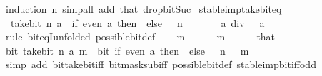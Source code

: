 \begin{isabellebody}
\ {\isacharparenleft}{\kern0pt}induction\ n{\isacharparenright}{\kern0pt}\ {\isacharparenleft}{\kern0pt}simp{\isacharunderscore}{\kern0pt}all\ add{\isacharcolon}{\kern0pt}\ that\ drop{\isacharunderscore}{\kern0pt}bit{\isacharunderscore}{\kern0pt}Suc{\isacharparenright}{\kern0pt}%
\endisatagproof
{\isafoldproof}%
%
\isadelimproof
\isanewline
%
\endisadelimproof
\isanewline
{}\isamarkupfalse%
\ stable{\isacharunderscore}{\kern0pt}imp{\isacharunderscore}{\kern0pt}take{\isacharunderscore}{\kern0pt}bit{\isacharunderscore}{\kern0pt}eq{\isacharcolon}{\kern0pt}\isanewline
\ \ {\isacartoucheopen}take{\isacharunderscore}{\kern0pt}bit\ n\ a\ {\isacharequal}{\kern0pt}\ {\isacharparenleft}{\kern0pt}if\ even\ a\ then\ {}\ else\ {}\ {\isacharcircum}{\kern0pt}\ n\ {\isacharminus}{\kern0pt}\ {}{\isacharparenright}{\kern0pt}{\isacartoucheclose}\isanewline
\ \ \ \ \ {\isacartoucheopen}a\ div\ {}\ {\isacharequal}{\kern0pt}\ a{\isacartoucheclose}\isanewline
%
\isadelimproof
%
\endisadelimproof
%
\isatagproof
{}\isamarkupfalse%
\ {\isacharparenleft}{\kern0pt}rule\ bit{\isacharunderscore}{\kern0pt}eqI{\isacharbrackleft}{\kern0pt}unfolded\ possible{\isacharunderscore}{\kern0pt}bit{\isacharunderscore}{\kern0pt}def{\isacharbrackright}{\kern0pt}{\isacharparenright}{\kern0pt}\isanewline
\ \ \isamarkupfalse%
\ m\isanewline
\ \ \isamarkupfalse%
\ {\isacartoucheopen}{}\ {\isacharcircum}{\kern0pt}\ m\ {\isasymnoteq}\ {}{\isacartoucheclose}\isanewline
\ \ \isamarkupfalse%
\ that\ \isamarkupfalse%
\ {\isacartoucheopen}bit\ {\isacharparenleft}{\kern0pt}take{\isacharunderscore}{\kern0pt}bit\ n\ a{\isacharparenright}{\kern0pt}\ m\ {\isasymlongleftrightarrow}\ bit\ {\isacharparenleft}{\kern0pt}if\ even\ a\ then\ {}\ else\ {}\ {\isacharcircum}{\kern0pt}\ n\ {\isacharminus}{\kern0pt}\ {}{\isacharparenright}{\kern0pt}\ m{\isacartoucheclose}\isanewline
\ \ \ \ \isamarkupfalse%
\ {\isacharparenleft}{\kern0pt}simp\ add{\isacharcolon}{\kern0pt}\ bit{\isacharunderscore}{\kern0pt}take{\isacharunderscore}{\kern0pt}bit{\isacharunderscore}{\kern0pt}iff\ bit{\isacharunderscore}{\kern0pt}mask{\isacharunderscore}{\kern0pt}sub{\isacharunderscore}{\kern0pt}iff\ possible{\isacharunderscore}{\kern0pt}bit{\isacharunderscore}{\kern0pt}def\ stable{\isacharunderscore}{\kern0pt}imp{\isacharunderscore}{\kern0pt}bit{\isacharunderscore}{\kern0pt}iff{\isacharunderscore}{\kern0pt}odd{\isacharparenright}{\kern0pt}\isanewline

\end{isabellebody}
